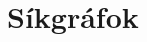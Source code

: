 \documentclass[12pt]{article}
\begin{document}
		
	
	\section{Síkgráfok}
	
		

	
	
	
	
	
	
	
\end{document}
